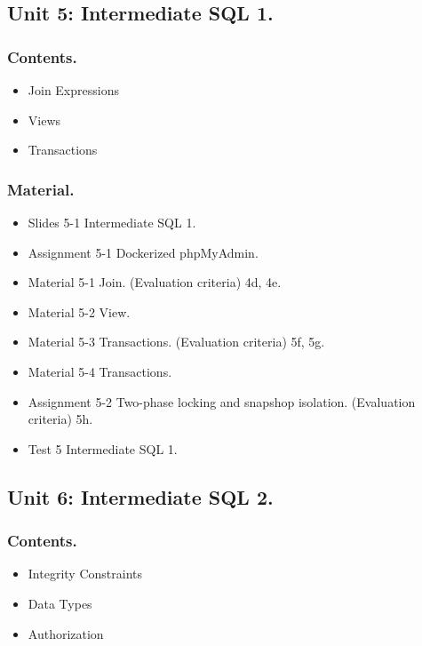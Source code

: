 \documentclass[catalan, a4paper, 12pt, titlepage]{article}
\begin{document}
  \subsection{Unit 5: Intermediate SQL 1.}

  \subsubsection{Contents.}

  \begin{itemize}
	  \item Join Expressions
	  \item Views
	  \item Transactions
  \end{itemize}

  \subsubsection{Material.}

  \begin{itemize}
	  \item Slides 5-1 Intermediate SQL 1.
	  \item Assignment 5-1 Dockerized phpMyAdmin.
	  \item Material 5-1 Join. (\faGraduationCap Evaluation criteria) 4d, 4e.
	  \item Material 5-2 View.
	  \item Material 5-3 Transactions. (\faGraduationCap Evaluation criteria) 5f, 5g.
	  \item Material 5-4 Transactions.
	  \item Assignment 5-2 Two-phase locking and snapshop isolation. (\faGraduationCap Evaluation criteria) 5h.
	  \item Test 5 Intermediate SQL 1.
  \end{itemize}

  \subsection{Unit 6: Intermediate SQL 2.}
  
  \subsubsection{Contents.}
  \begin{itemize}
	  \item Integrity Constraints
	  \item Data Types
	  \item Authorization
  \end{itemize}
\end{document}
